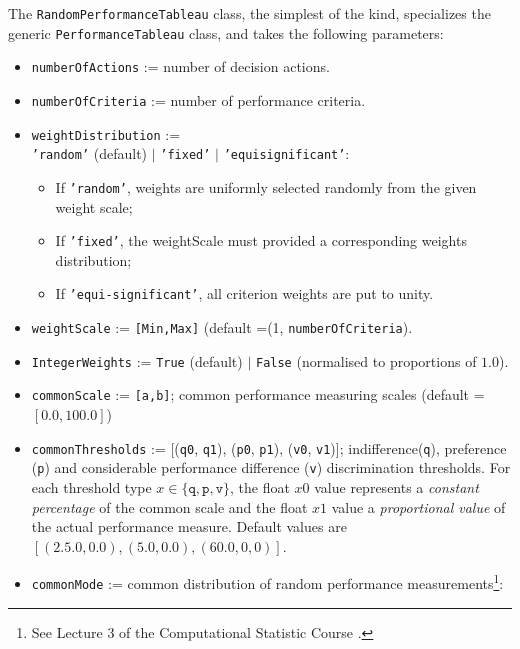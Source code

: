 The \texttt{RandomPerformanceTableau} class, the simplest of the kind, specializes the generic \texttt{PerformanceTableau} class, and takes the following parameters:
\begin{itemize}[leftmargin=0.5cm,rightmargin=0.5cm]
\item \texttt{numberOfActions} := number of decision actions.
\item \texttt{numberOfCriteria} := number of performance criteria.
\item \texttt{weightDistribution} := \\
   \texttt{'random'} (default) $|$ \texttt{'fixed'} $|$ \texttt{'equisignificant'}:
      \begin{itemize}[rightmargin=1cm,topsep=1pt]
         \item If \texttt{'random'}, weights are uniformly selected randomly from the given weight scale;
         \item If \texttt{'fixed'}, the weightScale must provided a corresponding weights distribution;
         \item If \texttt{'equi-significant'}, all criterion weights are put to unity.
      \end{itemize}
\item \texttt{weightScale} := \texttt{[Min,Max]} (default =(1, \texttt{numberOfCriteria}).
\item \texttt{IntegerWeights} := \texttt{True} (default) $|$ \texttt{False} (normalised to proportions of $1.0$).
\item \texttt{commonScale} := \texttt{[a,b]}; common performance measuring scales (default = $[0.0,100.0]$)
\item \texttt{commonThresholds} := [(\texttt{q0}, \texttt{q1}), (\texttt{p0}, \texttt{p1}), (\texttt{v0}, \texttt{v1})]; indifference(\texttt{q}), preference (\texttt{p}) and considerable performance difference (\texttt{v}) discrimination thresholds. For each threshold type $x \in \{\mathtt{q},\mathtt{p},\mathtt{v}\}$, the float $x0$ value represents a \emph{constant percentage} of the common scale and the float $x1$ value a \emph{proportional value} of the actual performance measure. Default values are $[(2.5.0,0.0), (5.0,0.0), (60.0,0,0)]$. 
\item \texttt{commonMode} := common distribution of random performance measurements\footnote{See Lecture 3 of the Computational Statistic Course \citep{CPSTAT-L3}.}:
      \begin{itemize}[rightmargin=1cm]

\end{itemize}
\end{itemize}
